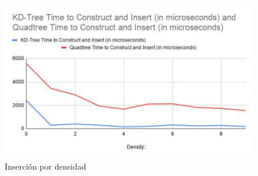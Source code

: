 \documentclass[9pt,a4paper,twoside]{rho-class/rho}
\begin{document}
            \begin{figure}[h]
                \centering
                \includegraphics[width=\linewidth]{figures/insertion2.pdf}
                \caption{Inserción por densidad\cite{amay12_spatialsearch}}
                \label{fig:insertion_p_d_figure}
            \end{figure}
\end{document}
